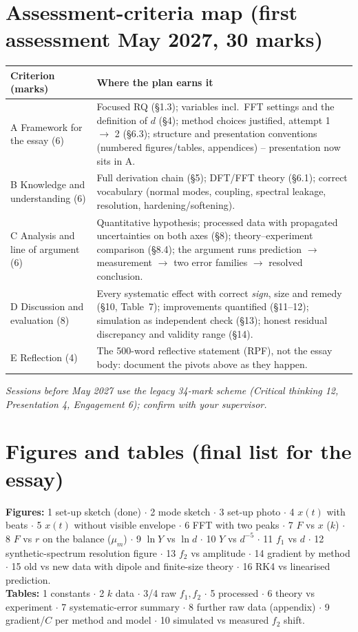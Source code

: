\documentclass[11pt,a4paper]{article}
\newcommand{\Y}{Y}                       %
\newcommand{\mum}{\mu_m}
\begin{document}
\section{Assessment-criteria map (first assessment May 2027, 30 marks)}
\begin{center}\small
\begin{tabular}{@{}p{4.2cm} p{11.3cm}@{}}
\toprule
Criterion (marks) & Where the plan earns it \\
\midrule
A Framework for the essay (6) & Focused RQ (\S1.3); variables incl.\ FFT settings and the definition of $d$ (\S4); method choices justified, attempt 1 $\to$ 2 (\S6.3); structure and presentation conventions (numbered figures/tables, appendices) -- presentation now sits in A. \\
B Knowledge and understanding (6) & Full derivation chain (\S5); DFT/FFT theory (\S6.1); correct vocabulary (normal modes, coupling, spectral leakage, resolution, hardening/softening). \\
C Analysis and line of argument (6) & Quantitative hypothesis; processed data with propagated uncertainties on both axes (\S8); theory--experiment comparison (\S8.4); the argument runs prediction $\to$ measurement $\to$ two error families $\to$ resolved conclusion. \\
D Discussion and evaluation (8) & Every systematic effect with correct \emph{sign}, size and remedy (\S10, Table~7); improvements quantified (\S11--12); simulation as independent check (\S13); honest residual discrepancy and validity range (\S14). \\
E Reflection (4) & The 500-word reflective statement (RPF), not the essay body: document the pivots above as they happen. \\
\bottomrule
\end{tabular}
\end{center}
\emph{Sessions before May 2027 use the legacy 34-mark scheme (Critical thinking 12,
Presentation 4, Engagement 6); confirm with your supervisor.}

\section{Figures and tables (final list for the essay)}
\textbf{Figures:} 1 set-up sketch (done) $\cdot$ 2 mode sketch $\cdot$ 3 set-up photo $\cdot$
4 $x(t)$ with beats $\cdot$ 5 $x(t)$ without visible envelope $\cdot$ 6 FFT with two peaks
$\cdot$ 7 $F$ vs $x$ ($k$) $\cdot$ 8 $F$ vs $r$ on the balance ($\mum$) $\cdot$ 9 $\ln\Y$ vs
$\ln d$ $\cdot$ 10 $\Y$ vs $d^{-5}$ $\cdot$ 11 $f_1$ vs $d$ $\cdot$ 12 synthetic-spectrum
resolution figure $\cdot$ 13 $f_2$ vs amplitude $\cdot$ 14 gradient by method $\cdot$ 15 old vs
new data with dipole and finite-size theory $\cdot$ 16 RK4 vs linearised prediction.\\
\textbf{Tables:} 1 constants $\cdot$ 2 $k$ data $\cdot$ 3/4 raw $f_1,f_2$ $\cdot$ 5 processed
$\cdot$ 6 theory vs experiment $\cdot$ 7 systematic-error summary $\cdot$ 8 further raw data
(appendix) $\cdot$ 9 gradient/$C$ per method and model $\cdot$ 10 simulated vs measured $f_2$
shift.
\end{document}
